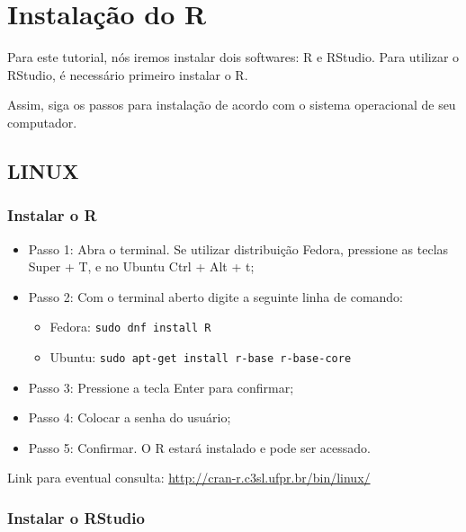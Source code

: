 \documentclass[
  brazil,
]{book}
\providecommand{\tightlist}{%
  \setlength{\itemsep}{0pt}\setlength{\parskip}{0pt}}
\begin{document}
\hypertarget{instalauxe7uxe3o-do-r}{%
\chapter{Instalação do R}\label{instalauxe7uxe3o-do-r}}

Para este tutorial, nós iremos instalar dois softwares: R e RStudio. Para utilizar o RStudio, é necessário primeiro instalar o R.

Assim, siga os passos para instalação de acordo com o sistema operacional de seu computador.

\hypertarget{linux}{%
\section{LINUX}\label{linux}}

\hypertarget{instalar-o-r}{%
\subsection{Instalar o R}\label{instalar-o-r}}

\begin{itemize}
\tightlist
\item
  Passo 1: Abra o terminal. Se utilizar distribuição Fedora, pressione as teclas Super + T, e no Ubuntu Ctrl + Alt + t;\\
\item
  Passo 2: Com o terminal aberto digite a seguinte linha de comando:

  \begin{itemize}
  \tightlist
  \item
    Fedora: \texttt{sudo\ dnf\ install\ R}
  \item
    Ubuntu: \texttt{sudo\ apt-get\ install\ r-base\ r-base-core}\\
  \end{itemize}
\item
  Passo 3: Pressione a tecla Enter para confirmar;\\
\item
  Passo 4: Colocar a senha do usuário;\\
\item
  Passo 5: Confirmar. O R estará instalado e pode ser acessado.
\end{itemize}

Link para eventual consulta: \url{http://cran-r.c3sl.ufpr.br/bin/linux/}

\hypertarget{instalar-o-rstudio}{%
\subsection{Instalar o RStudio}\label{instalar-o-rstudio}}
\end{document}
